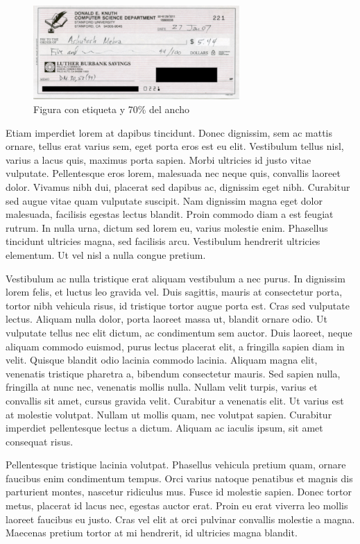 \documentclass[a4paper,10pt]{article}
\theoremstyle{teorema}
\theoremstyle{plano}
\theoremstyle{titulo}
\begin{document}
\begin{figure}[b]
    \centering
    \includegraphics[width=0.7\textwidth]{imagen3}
    \caption{Figura con etiqueta  y 70\% del ancho}
    \label{fig:cheque}
\end{figure}


Etiam imperdiet lorem at dapibus tincidunt. Donec dignissim, sem ac mattis ornare, tellus erat varius sem, eget porta eros est eu elit. Vestibulum tellus nisl, varius a lacus quis, maximus porta sapien. Morbi ultricies id justo vitae vulputate. Pellentesque eros lorem, malesuada nec neque quis, convallis laoreet dolor. Vivamus nibh dui, placerat sed dapibus ac, dignissim eget nibh. Curabitur sed augue vitae quam vulputate suscipit. Nam dignissim magna eget dolor malesuada, facilisis egestas lectus blandit. Proin commodo diam a est feugiat rutrum. In nulla urna, dictum sed lorem eu, varius molestie enim. Phasellus tincidunt ultricies magna, sed facilisis arcu. Vestibulum hendrerit ultricies elementum. Ut vel nisl a nulla congue pretium.

Vestibulum ac nulla tristique erat aliquam vestibulum a nec purus. In dignissim lorem felis, et luctus leo gravida vel. Duis sagittis, mauris at consectetur porta, tortor nibh vehicula risus, id tristique tortor augue porta est. Cras sed vulputate lectus. Aliquam nulla dolor, porta laoreet massa ut, blandit ornare odio. Ut vulputate tellus nec elit dictum, ac condimentum sem auctor. Duis laoreet, neque aliquam commodo euismod, purus lectus placerat elit, a fringilla sapien diam in velit. Quisque blandit odio lacinia commodo lacinia. Aliquam magna elit, venenatis tristique pharetra a, bibendum consectetur mauris. Sed sapien nulla, fringilla at nunc nec, venenatis mollis nulla. Nullam velit turpis, varius et convallis sit amet, cursus gravida velit. Curabitur a venenatis elit. Ut varius est at molestie volutpat. Nullam ut mollis quam, nec volutpat sapien. Curabitur imperdiet pellentesque lectus a dictum. Aliquam ac iaculis ipsum, sit amet consequat risus.

Pellentesque tristique lacinia volutpat. Phasellus vehicula pretium quam, ornare faucibus enim condimentum tempus. Orci varius natoque penatibus et magnis dis parturient montes, nascetur ridiculus mus. Fusce id molestie sapien. Donec tortor metus, placerat id lacus nec, egestas auctor erat. Proin eu erat viverra leo mollis laoreet faucibus eu justo. Cras vel elit at orci pulvinar convallis molestie a magna. Maecenas pretium tortor at mi hendrerit, id ultricies magna blandit.
\end{document}
